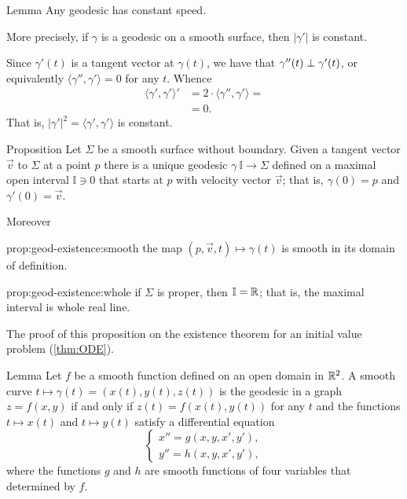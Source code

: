\begin{thm}{Lemma}\label{lem:constant-speed}
Any geodesic has constant speed.

More precisely, if $\gamma$ is a geodesic on a smooth surface, then $|\gamma'|$ is constant.
\end{thm}

Since $\gamma'(t)$ is a tangent vector at $\gamma(t)$,
we have that $\gamma''(t)\z\perp\gamma'(t)$, or equivalently $\langle\gamma'',\gamma'\rangle=0$ for any $t$.
Whence 
\begin{align*}
\langle\gamma',\gamma'\rangle'&=2\cdot \langle\gamma'',\gamma'\rangle=
\\
&=0.
\end{align*}
That is, $|\gamma'|^2=\langle\gamma',\gamma'\rangle$ is constant.
\qeds

\begin{thm}{Proposition}\label{prop:geod-existence} 
Let $\Sigma$ be  a smooth surface without boundary.
Given a tangent vector ${\vec v}$ to $\Sigma$ at a point $p$
there is a unique geodesic $\gamma\:\mathbb{I}\to \Sigma$ defined on a maximal open interval $\mathbb{I}\ni 0$ that starts at $p$ with velocity vector ${\vec v}$;
that is, $\gamma(0)=p$ and $\gamma'(0)={\vec v}$.

Moreover
\begin{subthm}{prop:geod-existence:smooth} the map $(p,{\vec v},t)\mapsto \gamma(t)$ is smooth in its domain of definition.
\end{subthm}

\begin{subthm}{prop:geod-existence:whole} if $\Sigma$ is proper, then $\mathbb{I}=\mathbb{R}$; that is, the maximal interval is whole real line.
\end{subthm}

\end{thm}

The proof of this proposition on the existence theorem for an initial value problem (\ref{thm:ODE}).

\begin{thm}{Lemma}\label{lem:geodesic=2nd-order}
Let $f$ be  a smooth function defined on an open domain in $\mathbb{R}^2$.
A smooth curve $t\mapsto \gamma(t)=(x(t),y(t),z(t))$ is the geodesic in a graph $z=f(x,y)$ if and only if $z(t)=f(x(t),y(t))$ for any $t$ and the functions $t\mapsto x(t)$ and $t\mapsto y(t)$
satisfy a differential equation
\[
\begin{cases}
x''=g(x,y,x',y'),
\\
y''=h(x,y,x',y'),
\end{cases}
\]
where the functions $g$ and $h$ are smooth functions of four variables that determined by $f$.
\end{thm}

